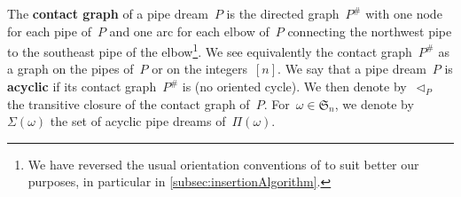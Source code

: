 \documentclass{amsart}
\theoremstyle{definition}
\newcommand{\N}{\mathbb{N}} %
\newcommand{\eqdef}{\mbox{\,\raisebox{0.2ex}{\scriptsize\ensuremath{\mathrm:}}\ensuremath{=}\,}} %
\newcommand{\defn}[1]{\textbf{\textsf{\color{PineGreen} #1}}} %
\newcommand{\vincent}[1]{\todo[color=blue!30]{#1 \\ \hfill --- V.}}
\newcommand{\fS}{\mathfrak{S}} %
\newcommand{\pipeDreams}{\Pi} %
\newcommand{\contact}{^\#} %
\newcommand{\acyclicPipeDreams}{\Sigma} %
\newcommand{\less}{\vartriangleleft} %
\newcommand{\contactLess}[1]{\less_{#1}} %
\begin{document}
The \defn{contact graph} of a pipe dream~$P$ is the directed graph~$P\contact$ with one node for each pipe of~$P$ and one arc for each elbow of~$P$ connecting the northwest pipe to the southeast pipe of the elbow\footnote{We have reversed the usual orientation conventions of \cite{PilaudSantos-brickPolytope, PilaudPocchiola, Pilaud-BrickAlgebra} to suit better our purposes, in particular in \cref{subsec:insertionAlgorithm}.}.
We see equivalently the contact graph~$P\contact$ as a graph on the pipes of~$P$ or on the integers~$[n]$.
We say that a pipe dream~$P$ is \defn{acyclic} if its contact graph~$P\contact$ is (no oriented cycle).
We then denote by~$\contactLess{P}$ the transitive closure of the contact graph of~$P$.
For~$\omega \in \fS_n$, we denote by~$\acyclicPipeDreams(\omega)$ the set of acyclic pipe dreams of~$\pipeDreams(\omega)$.
\end{document}
